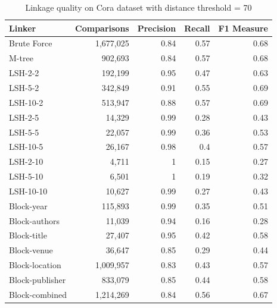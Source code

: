 \documentclass{llncs}
\begin{document}
\begin{table}[ht]
\centering
\begin{tabular}{l|r|r|r|r}
\parbox{0.2\textwidth}{\centering Linker} &
\parbox{0.2\textwidth}{\centering Comparisons} &
\parbox{0.17\textwidth}{\centering Precision} &
\parbox{0.17\textwidth}{\centering Recall} &
\parbox{0.17\textwidth}{\centering F1 Measure} \\ \hline \hline
Brute Force        & 1,677,025                 & 0.84      & 0.57   & 0.68       \\ \hline
M-tree              &  902,693                  & 0.84      & 0.57   & 0.68       \\ \hline
LSH-2-2            &  192,199	& 0.95	& 0.47	& 0.63       \\
LSH-5-2            &  342,849	& 0.91	& 0.55	& 0.69       \\
LSH-10-2           &  513,947	& 0.88	& 0.57	& 0.69       \\
LSH-2-5            &  14,329	& 0.99	& 0.28	& 0.43      \\
LSH-5-5            &  22,057	& 0.99	& 0.36	& 0.53       \\
LSH-10-5           &  26,167	& 0.98	& 0.4	& 0.57      \\
LSH-2-10           &  4,711	& 1	& 0.15	& 0.27    \\
LSH-5-10           &  6,501	& 1	& 0.19	& 0.32      \\
LSH-10-10          & 10,627  	& 0.99	& 0.27& 	0.43       \\  \hline
Block-year         &  115,893                  & 0.99      & 0.35   & 0.51       \\
Block-authors      &   11,039                   & 0.94      & 0.16   & 0.28       \\
Block-title        &   27,407                   & 0.95      & 0.42   & 0.58       \\
Block-venue        &   36,647                   & 0.85      & 0.29   & 0.44       \\
Block-location     & 1,009,957                 & 0.83      & 0.43   & 0.57       \\
Block-publisher    &  833,079                  & 0.85      & 0.44   & 0.58       \\
Block-combined     & 1,214,269                 & 0.84      & 0.56   & 0.67       \\ \hline
\end{tabular}
\caption{Linkage quality on Cora dataset with distance threshold = 70
\label{comparison-of-results-cora}
}
\end{table}
\end{document}

